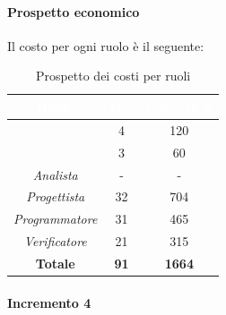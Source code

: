 \paragraph*{Prospetto economico}
Il costo per ogni ruolo è il seguente:
\begin{table}[H]
	\begin{center}
		\begin{tabular}{ |c c c| }
			\rowcolor{darkblue} 
			\textcolor{white}{\textbf{Ruolo}} & \textcolor{white}{\textbf{Ore}} & \textcolor{white}{\textbf{Costo in €}}\\ \hline
		{\Responsabile} 			& 4 	& 120 \\ \hline
		{\Amministratore}		 	& 3 	& 60 \\ \hline
		\textit{Analista} 			& - 	& - \\ \hline
		\textit{Progettista} 		& 32 	& 704 \\ \hline
		\textit{Programmatore}  	& 31 	& 465 \\ \hline
		\textit{Verificatore} 		& 21 	& 315 \\ \hline
		\textbf{Totale} & \textbf{91} & \textbf{1664} \\ \hline
		\end{tabular}
		\caption{Prospetto dei costi per ruoli}
	\end{center}
\end{table}
\paragraph{Incremento 4}
